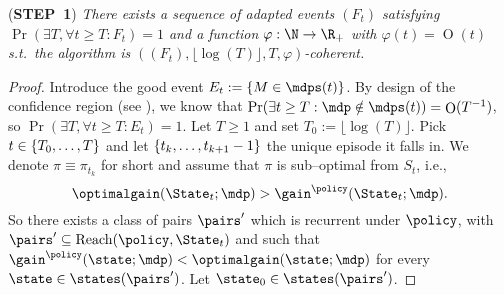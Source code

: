 \documentclass[preprint,cleveref,12pt]{colt2025}
\DeclarePairedDelimiter{\braces}{\{}{\}}	%
\DeclareMathOperator*{\OH}{\mathrm{O}}
\def\model{\mdp}
\def\models{\mdps}
\def\optgain{\optimalgain} %
\def\Reach{\mathrm{Reach}}
\def\STEP#1{(\strong{STEP~#1})}
\newcommand{\strong}[1]{\textbf{#1}}
\begin{document}
    \bigskip
    \noindent
    \STEP{1}
    \textit{
        There exists a sequence of adapted events $(F_t)$ satisfying $\Pr(\exists T, \forall t \ge T: F_t) = 1$ and a function $\varphi : \N \to \R_+$ with $\varphi(t) = \OH(t)$ s.t.~the algorithm is $((F_t), \lfloor \log(T) \rfloor, T, \varphi)$-coherent.
    }
    \medskip
    \begin{proof}
        Introduce the good event $E_t := \braces*{M \in \models(t)}$.
        By design of the confidence region (see ), we know that $\Pr(\exists t \ge T: \model \notin \models(t)) = \OH(T^{-1})$, so $\Pr(\exists T, \forall t \ge T: E_t) = 1$.
        Let $T \ge 1$ and set $T_0 := \lfloor \log(T) \rfloor$.
        Pick $t \in \braces{T_0, \ldots, T}$ and let $\braces{t_k, \ldots, t_{k+1}-1}$ the unique episode it falls in.
        We denote $\pi \equiv \pi_{t_k}$ for short and assume that $\pi$ is sub--optimal from $S_t$, i.e.,
        \begin{equation}
            \optgain(\State_t; \model) > \gain^\policy(\State_t; \model)
            .
        \end{equation}
        So there exists a class of pairs $\pairs'$ which is recurrent under $\policy$, with $\pairs' \subseteq \Reach(\policy, \State_t)$ and such that $\gain^\policy(\state; \model) < \optgain(\state; \model)$ for every $\state \in \states(\pairs')$. 
        Let $\state_0 \in \states(\pairs')$. 


\end{proof}
\end{document}

